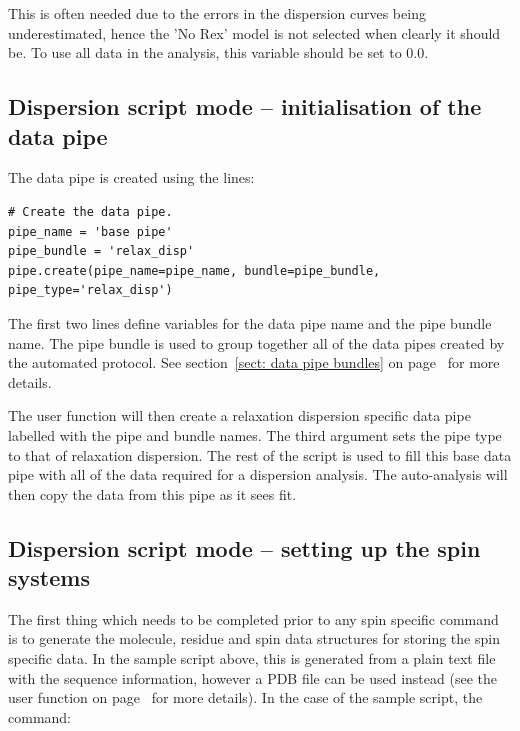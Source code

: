 This is often needed due to the errors in the dispersion curves being underestimated, hence the 'No Rex' model is not selected when clearly it should be.
To use all data in the analysis, this variable should be set to 0.0.



\subsection{Dispersion script mode -- initialisation of the data pipe} \label{sect: dispersion initialisation}

The data pipe is created using the lines:

\begin{lstlisting}[firstnumber=40]
# Create the data pipe.
pipe_name = 'base pipe'
pipe_bundle = 'relax_disp'
pipe.create(pipe_name=pipe_name, bundle=pipe_bundle, pipe_type='relax_disp')
\end{lstlisting}

The first two lines define variables for the data pipe name and the pipe bundle name.
The pipe bundle is used to group together all of the data pipes created by the automated protocol.
See section~\ref{sect: data pipe bundles} on page~\pageref{sect: data pipe bundles} for more details.

The  user function will then create a relaxation dispersion specific data pipe labelled with the pipe and bundle names.
The third argument sets the pipe type to that of relaxation dispersion.
The rest of the script is used to fill this base data pipe with all of the data required for a dispersion analysis.
The auto-analysis will then copy the data from this pipe as it sees fit.



\subsection{Dispersion script mode -- setting up the spin systems}

The first thing which needs to be completed prior to any spin specific command is to generate the molecule, residue and spin data structures for storing the spin specific data.
In the sample script above, this is generated from a plain text file with the sequence information, however a PDB file can be used instead (see the  user function on page~\pageref{uf: structure.read_pdb} for more details).
In the case of the sample script, the command:

